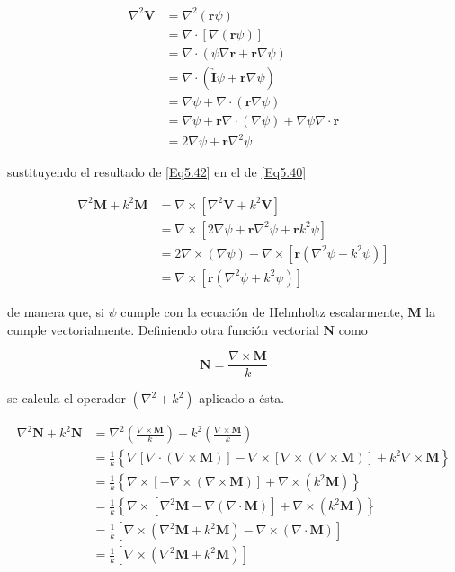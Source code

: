 \documentclass[a4paper,10pt]{article}
\newcommand{\ten}[1] {\overleftrightarrow{\textbf{#1}}} %
\begin{document}
\begin{subequations}
\begin{align}
\nabla^2\textbf{V}
&=\nabla^2(\textbf{r}\psi)	\\
&=\nabla\cdot[\nabla(\textbf{r}\psi)]	\\
&=\nabla\cdot(\psi\nabla\textbf{r}+\textbf{r}\nabla\psi)	\\
&=\nabla\cdot(\ten{I}\psi+\textbf{r}\nabla\psi)	\\
&=\nabla\psi+\nabla\cdot(\textbf{r}\nabla\psi)	\\
&=\nabla\psi+\textbf{r}\nabla\cdot(\nabla\psi)+\nabla\psi\nabla\cdot\textbf{r}	\\
&=2\nabla\psi+\textbf{r}\nabla^2\psi
\end{align}
\label{Eq5.42}
\end{subequations}

sustituyendo el resultado de \eqref{Eq5.42} en el de \eqref{Eq5.40}

\begin{subequations}
\begin{align}
\nabla^2\textbf{M}+k^2\textbf{M}
&=\nabla\times[\nabla^2\textbf{V}+k^2\textbf{V}]\\
&=\nabla\times[2\nabla\psi+\textbf{r}\nabla^2\psi+\textbf{r}k^2\psi]\\
&=2\nabla\times(\nabla\psi)+\nabla\times[\textbf{r}(\nabla^2\psi+k^2\psi)]	\\
&=\nabla\times[\textbf{r}(\nabla^2\psi+k^2\psi)]	
\end{align}
\end{subequations}

de manera que, si $\psi$ cumple con la ecuación de Helmholtz escalarmente, $\textbf{M}$ la cumple vectorialmente. Definiendo otra función vectorial $\textbf{N}$ como

\begin{equation}
\textbf{N}=\frac{\nabla\times\textbf{M}}{k}
\end{equation}

se calcula el operador $(\nabla^2+k^2)$ aplicado a ésta.

\begin{subequations}
\begin{align}
\nabla^2\textbf{N}+k^2\textbf{N}
&=\nabla^2\left(\frac{\nabla\times\textbf{M}}{k}\right)+k^2\left(\frac{\nabla\times\textbf{M}}{k}\right)	\\
&=\frac{1}{k}\left\{\nabla[\nabla\cdot(\nabla\times\textbf{M})]-\nabla\times[\nabla\times(\nabla\times\textbf{M})]+k^2\nabla\times\textbf{M}\right\}	\\
&=\frac{1}{k}\left\{\nabla\times[-\nabla\times(\nabla\times\textbf{M})]+\nabla\times(k^2\textbf{M})\right\}	\\
&=\frac{1}{k}\left\{\nabla\times[\nabla^2\textbf{M}-\nabla(\nabla\cdot\textbf{M})]+\nabla\times(k^2\textbf{M})\right\}	\\
&=\frac{1}{k}[\nabla\times(\nabla^2\textbf{M}+k^2\textbf{M})-\nabla\times(\nabla\cdot\textbf{M})]	\\
&=\frac{1}{k}[\nabla\times(\nabla^2\textbf{M}+k^2\textbf{M})]
\end{align}
\end{subequations}
\end{document}
